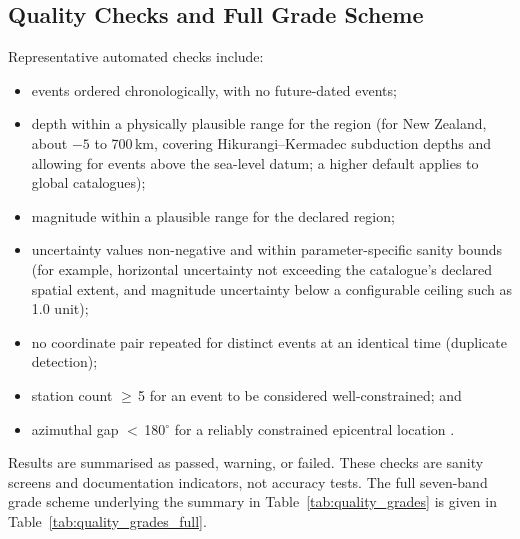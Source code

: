 \documentclass[11pt]{article}
\begin{document}
\subsection{Quality Checks and Full Grade Scheme}
Representative automated checks include:
\begin{itemize}
\setlength{\itemsep}{1pt}
\item events ordered chronologically, with no future-dated events;
\item depth within a physically plausible range for the region (for New Zealand, about $-5$ to 700\,km, covering Hikurangi--Kermadec subduction depths and allowing for events above the sea-level datum; a higher default applies to global catalogues);
\item magnitude within a plausible range for the declared region;
\item uncertainty values non-negative and within parameter-specific sanity bounds (for example, horizontal uncertainty not exceeding the catalogue's declared spatial extent, and magnitude uncertainty below a configurable ceiling such as 1.0 unit);
\item no coordinate pair repeated for distinct events at an identical time (duplicate detection);
\item station count $\geq$\,5 for an event to be considered well-constrained; and
\item azimuthal gap $<$\,180$^\circ$ for a reliably constrained epicentral location \citep{usgs_comcat}.
\end{itemize}
Results are summarised as passed, warning, or failed. These checks are sanity screens and documentation indicators, not accuracy tests. The full seven-band grade scheme underlying the summary in Table~\ref{tab:quality_grades} is given in Table~\ref{tab:quality_grades_full}.
\end{document}

